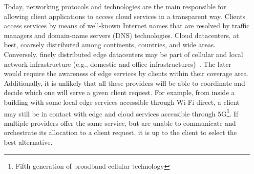 Today, networking protocols and technologies are the main responsible for allowing client applications to access cloud services in a transparent way. Clients access services by means of well-known Internet names that are resolved by traffic managers and domain-name servers (DNS) technologies. Cloud datacenters, at best, coarsely distributed among continents, countries, and wide areas. Conversely, finely distributed edge datacenters may be part of cellular and local network infrastructure (e.g., domestic and office infrastructures)~\cite{Bonomi2014}. The later would require the awareness of edge services by clients within their coverage area. %
Additionally, it is unlikely that all these providers will be able to coordinate and decide which one will serve a given client request. For example, from inside a building with some local edge services accessible through Wi-Fi direct, a client may still be in contact with edge and cloud services accessible through 5G\footnote{Fifth generation of broadband cellular technology}. If multiple providers offer the same service, but are unable to communicate and orchestrate its allocation to a client request, it is up to the client to select the best alternative. 








